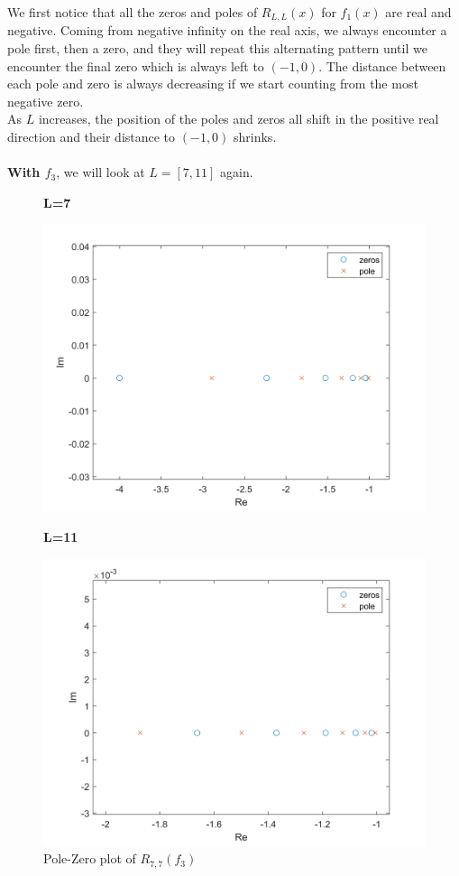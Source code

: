 \documentclass[10pt]{article}
\begin{document}
\noindent We first notice that all the zeros and poles of $R_{L,L}(x)$ for $f_1(x)$ are real and negative. Coming from negative infinity on the real axis, we always encounter a pole first, then a zero, and they will repeat this alternating pattern until we encounter the final zero which is always left to $(-1,0)$. The distance between each pole and zero is always decreasing if we start counting from the most negative zero.\\
As $L$ increases, the position of the poles and zeros all shift in the positive real direction and their distance to $(-1,0)$ shrinks.\\\\
\textbf{With $f_3$}, we will look at $L=[7,11]$ again.\\
\begin{figure}[H]
    \begin{minipage}[b]{0.47\linewidth}
            \centering
            \textbf{L=7}\par
            \includegraphics[width=\textwidth]{Files/q5,f3,7.png}
            \caption{Pole-Zero plot of $R_{7,7}(f_3)$}
        \end{minipage}
        \hfill
            \begin{minipage}[b]{0.47\linewidth}
            \centering
    \textbf{L=11}\par
    \includegraphics[width=\textwidth]{Files/q5,f3,11.png}

\end{minipage}
\end{figure}
\end{document}
